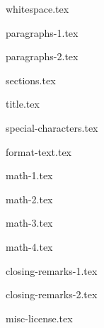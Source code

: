 \documentclass[allauthors]{../../cursuspresentatie}
\def\importslide#1#2{%
	{#2}
}
\begin{document}
\importslide{beginners}{whitespace.tex}

\importslide{beginners}{paragraphs-1.tex}
\importslide{beginners}{paragraphs-2.tex}



\importslide{beginners}{sections.tex}


\importslide{beginners}{title.tex}


\importslide{beginners}{special-characters.tex}

\importslide{beginners}{format-text.tex}


\importslide{beginners}{math-1.tex}

\importslide{beginners}{math-2.tex}


\importslide{beginners}{math-3.tex}

\importslide{beginners}{math-4.tex}


\importslide{beginners}{closing-remarks-1.tex}
\importslide{beginners}{closing-remarks-2.tex}

	
\importslide{misc}{misc-license.tex}
\end{document}

